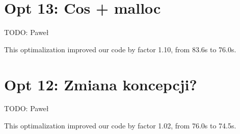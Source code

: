 \documentclass[11pt]{article}
\begin{document}
\section{Opt 13: Cos + malloc}
TODO: Paweł

This optimalization improved our code by factor 1.10, from 83.6s to 76.0s.


\section{Opt 12: Zmiana koncepcji?}
TODO: Paweł

This optimalization improved our code by factor 1.02, from 76.0s to 74.5s.
\end{document}
